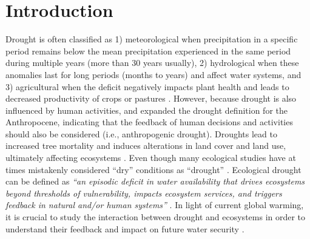 \documentclass[
  authoryear,
  preprint,
  3p,
  onecolumn]{elsarticle}
\begin{document}
\ifdefined\Shaded\renewenvironment{Shaded}{\begin{tcolorbox}[frame hidden, borderline west={3pt}{0pt}{shadecolor}, interior hidden, enhanced, boxrule=0pt, sharp corners, breakable]}{\end{tcolorbox}}\fi

\hypertarget{introduction}{%
\section{Introduction}\label{introduction}}

Drought is often classified as 1) meteorological when precipitation in a
specific period remains below the mean precipitation experienced in the
same period during multiple years (more than 30 years usually), 2)
hydrological when these anomalies last for long periods (months to
years) and affect water systems, and 3) agricultural when the deficit
negatively impacts plant health and leads to decreased productivity of
crops or pastures \citep{Wilhite1985}. However, because drought is also
influenced by human activities, \citet{Loon2016} and
\citet{AghaKouchak2021} expanded the drought definition for the
Anthropocene, indicating that the feedback of human decisions and
activities should also be considered (i.e., anthropogenic drought).
Droughts lead to increased tree mortality \citep{Cheng2024} and induces
alterations in land cover and land use, ultimately affecting ecosystems
\citep{Crausbay2017}. Even though many ecological studies have at times
mistakenly considered ``dry'' conditions as ``drought''
\citep{Slette2019}. Ecological drought can be defined as \emph{``an
episodic deficit in water availability that drives ecosystems beyond
thresholds of vulnerability, impacts ecosystem services, and triggers
feedback in natural and/or human systems''} \citep{Crausbay2017}. In
light of current global warming, it is crucial to study the interaction
between drought and ecosystems in order to understand their feedback and
impact on future water security \citep{Bakker2012}.
\end{document}
